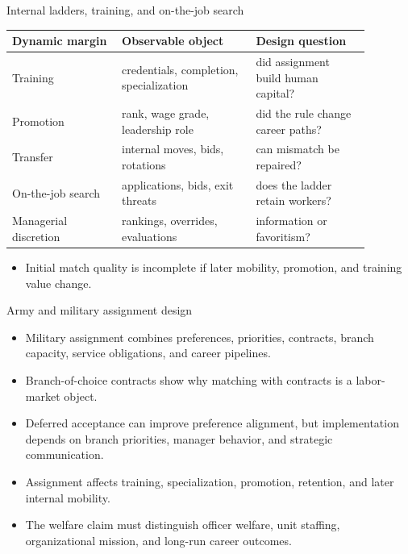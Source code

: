 \documentclass[aspectratio=169,11pt]{beamer}
\begin{document}
\begin{frame}{Internal ladders, training, and on-the-job search}
\small
\begin{tabular}{p{0.27\linewidth} p{0.33\linewidth} p{0.28\linewidth}}
\toprule
Dynamic margin & Observable object & Design question \\
\midrule
Training & credentials, completion, specialization & did assignment build human capital? \\
Promotion & rank, wage grade, leadership role & did the rule change career paths? \\
Transfer & internal moves, bids, rotations & can mismatch be repaired? \\
On-the-job search & applications, bids, exit threats & does the ladder retain workers? \\
Managerial discretion & rankings, overrides, evaluations & information or favoritism? \\
\bottomrule
\end{tabular}
\vspace{0.2cm}
\begin{itemize}
    \item Initial match quality is incomplete if later mobility, promotion, and training value change.
\end{itemize}
\end{frame}

\begin{frame}{Army and military assignment design}
\begin{itemize}
    \item Military assignment combines preferences, priorities, contracts, branch capacity, service obligations, and career pipelines.
    \item Branch-of-choice contracts show why matching with contracts is a labor-market object.
    \item Deferred acceptance can improve preference alignment, but implementation depends on branch priorities, manager behavior, and strategic communication.
    \item Assignment affects training, specialization, promotion, retention, and later internal mobility.
    \item The welfare claim must distinguish officer welfare, unit staffing, organizational mission, and long-run career outcomes.
\end{itemize}
\end{frame}
\end{document}
